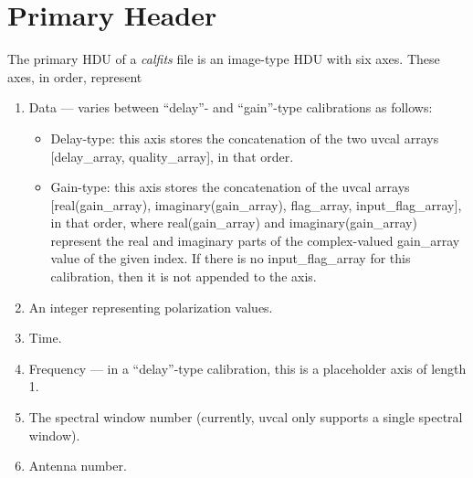 \documentclass[11pt, oneside, english]{article}   	%
\begin{document}

\section{Primary Header}
The primary HDU of a \emph{calfits} file is an image-type HDU with six axes.
These axes, in order, represent 
\begin{enumerate}
	\item{Data --- varies between ``delay''- and ``gain''-type calibrations as follows:}
	\begin{itemize}
	\item Delay-type: this axis stores the concatenation of the two uvcal arrays [delay\_array, quality\_array], in that order.
	\item Gain-type: this axis stores the concatenation of the uvcal arrays [real(gain\_array), imaginary(gain\_array), flag\_array, input\_flag\_array], in that order, where real(gain\_array) and imaginary(gain\_array) represent the real and imaginary parts of the complex-valued gain\_array value of the given index. If there is no input\_flag\_array for this calibration, then it is not appended to the axis.
	\end{itemize}
	\item{An integer representing polarization values.}
	\item{Time.}
	\item{Frequency --- in a ``delay''-type calibration, this is a placeholder axis of length 1.}
	\item{The spectral window number (currently, uvcal only supports a single spectral window).}
	\item{Antenna number.}
\end{enumerate}
\end{document}
